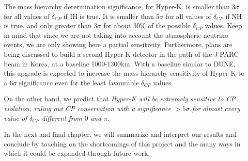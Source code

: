 The mass hierarchy determination significance, for Hyper-K, is smaller than
$3\sigma$ for all values of $\delta_{CP}$ if IH is true. It is smaller than
$5\sigma$ for all values of $\delta_{CP}$ if NH is true, and only greater than
$3\sigma$ for about 30\% of the possible $\delta_{CP}$ values.
Keep in mind that since we are not taking into account the atmospheric
neutrino events, we are only showing here a partial sensitivity. 
Furthermore, plans are being discussed\cite{t2hkk} to build a second Hyper-K detector in
the path of the J-PARC beam in Korea, at a baseline 1000-1300\si{\km}.
With a baseline similar to DUNE, this upgrade is expected to increase the mass
hierarchy sensitivity of Hyper-K to a $6\sigma$ significance even for the least
favourable $\delta_{CP}$ values.

On the other hand, we predict that \emph{Hyper-K will be extremely sensitive to CP
violation, ruling out CP conservation with a significance $>5\sigma$ for almost
every value of $\delta_{CP}$ different from $0$ and $\pi$.}

In the next and final chapter, we will summarize and interpret our results and
conclude by touching on the shortcomings of this project and the many ways in
which it could be expanded through future work.






